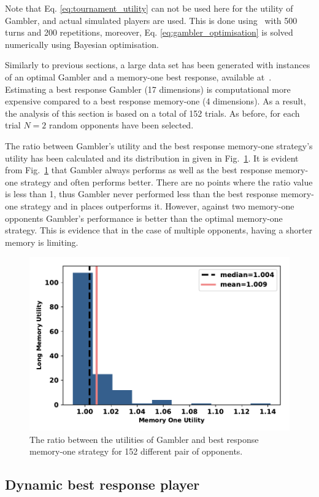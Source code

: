 \documentclass[10pt]{article}
\begin{document}
Note that Eq. \ref{eq:tournament_utility} can not be used here for the utility
of Gambler, and actual simulated players are used. This is done using~\cite{axelrodproject}
with 500 turns and 200 repetitions, moreover, Eq. \ref{eq:gambler_optimisation}
is solved numerically using Bayesian optimisation.

Similarly to previous sections, a large data set has been generated with
instances of an optimal Gambler and a memory-one best response, available
at~\cite{glynatsi2019}. Estimating a best response Gambler (17 dimensions) is
computational more expensive compared to a best response memory-one (4
dimensions). As a result, the analysis of this section is based on a total of
152 trials. As before, for each trial \(N=2\) random opponents have been selected.

The ratio between Gambler's utility and the best response memory-one strategy's utility has been calculated and its distribution in
given in Fig.~\ref{fig:utilities_gambler_mem_one}.
It is evident from Fig.~\ref{fig:utilities_gambler_mem_one} that
Gambler always performs as well as the best response memory-one strategy and often performs better. There are
no points where the ratio value is less than 1, thus Gambler never performed less
than the best response memory-one strategy and in places outperforms it.
However, against two memory-one opponents Gambler's performance is better than
the optimal memory-one strategy. This is evidence that in the case of multiple
opponents, having a
shorter memory is limiting.

\begin{figure}[!htbp]
    \centering
    \includegraphics[width=.5\textwidth]{img/gambler_performance_against_mem_one.pdf}
    \caption{The ratio between the utilities of Gambler and best response memory-one
    strategy for 152 different pair of opponents.}\label{fig:utilities_gambler_mem_one}
\end{figure}

\subsection{Dynamic best response player} %
\end{document}
